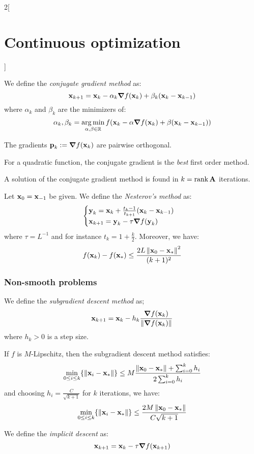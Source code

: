 \documentclass[../../../main_math.tex]{subfiles}
\begin{document}
\begin{multicols}{2}[\section{Continuous optimization}]
\begin{definition}
    We define the \emph{conjugate gradient method} as:
    \begin{equation*}
      \boldsymbol{\mathrm{x}}_{k+1}=\boldsymbol{\mathrm{x}}_k-\alpha_k \grad f(\boldsymbol{\mathrm{x}}_k)+\beta_k(\boldsymbol{\mathrm{x}}_k-\boldsymbol{\mathrm{x}}_{k-1})
    \end{equation*}
    where $\alpha_k$ and $\beta_k$ are the minimizers of:
    $$
      \alpha_k,\beta_k=\operatorname*{arg\,min}_{\alpha,\beta\in\mathbb{R}} f(\boldsymbol{\mathrm{x}}_k-\alpha \grad f(\boldsymbol{\mathrm{x}}_k)+\beta(\boldsymbol{\mathrm{x}}_k-\boldsymbol{\mathrm{x}}_{k-1}))
    $$
  \end{definition}
  \begin{lemma}
    The gradients $\boldsymbol{\mathrm{p}}_k:=\grad f(\boldsymbol{\mathrm{x}}_k)$ are pairwise orthogonal.
  \end{lemma}
  \begin{corollary}
    For a quadratic function, the conjugate gradient is the \textit{best} first order method.
  \end{corollary}
  \begin{corollary}
    A solution of the conjugate gradient method is found in $k=\rank \boldsymbol{\mathrm{A}}$ iterations.
  \end{corollary}
  \begin{definition}
    Let $\boldsymbol{\mathrm{x}}_0=\boldsymbol{\mathrm{x}}_{-1}$ be given. We define the \emph{Nesterov's method} as:
    $$
      \begin{cases}
        \boldsymbol{\mathrm{y}}_k=\boldsymbol{\mathrm{x}}_k+\frac{t_k-1}{t_{k+1}}(\boldsymbol{\mathrm{x}}_k-\boldsymbol{\mathrm{x}}_{k-1}) \\
        \boldsymbol{\mathrm{x}}_{k+1}=\boldsymbol{\mathrm{y}}_k-\tau \grad f(\boldsymbol{\mathrm{y}}_k)
      \end{cases}
    $$
    where $\tau=L^{-1}$ and for instance $t_k=1+\frac{k}{2}$. Moreover, we have:
    $$
      f(\boldsymbol{\mathrm{x}}_k)-f(\boldsymbol{\mathrm{x}}_*)\leq \frac{2L\left\|\boldsymbol{\mathrm{x}}_0-\boldsymbol{\mathrm{x}}_*\right\|^2}{(k+1)^2}
    $$
  \end{definition}
  \subsubsection{Non-smooth problems}
  \begin{definition}
    We define the \emph{subgradient descent method} as;
    $$
      \boldsymbol{\mathrm{x}}_{k+1}=\boldsymbol{\mathrm{x}}_k-h_k\frac{\grad f(\boldsymbol{\mathrm{x}}_k)}{\left\|\grad f(\boldsymbol{\mathrm{x}}_k)\right\|}
    $$
    where $h_k>0$ is a step size.
  \end{definition}
  \begin{proposition}
    If $f$ is $M$-Lipschitz, then the subgradient descent method satisfies:
    $$
      \min_{0\leq i\leq k} \{ \left\|\boldsymbol{\mathrm{x}}_i-\boldsymbol{\mathrm{x}}_*\right\| \}\leq M\frac{\left\|\boldsymbol{\mathrm{x}}_0-\boldsymbol{\mathrm{x}}_*\right\| + \sum_{i=0}^k h_i}{2\sum_{i=0}^k h_i}
    $$
    and choosing $h_i=\frac{C}{\sqrt{k+1}}$ for $k$ iterations, we have:
    $$
      \min_{0\leq i\leq k} \{ \left\|\boldsymbol{\mathrm{x}}_i-\boldsymbol{\mathrm{x}}_*\right\| \}\leq \frac{2M\left\|\boldsymbol{\mathrm{x}}_0-\boldsymbol{\mathrm{x}}_*\right\|}{C\sqrt{k+1}}
    $$
  \end{proposition}
  \begin{definition}
    We define the \emph{implicit descent} as:
    $$
      \boldsymbol{\mathrm{x}}_{k+1}=\boldsymbol{\mathrm{x}}_k-\tau \grad f(\boldsymbol{\mathrm{x}}_{k+1})
    $$
  \end{definition}
\end{multicols}
\end{document}
